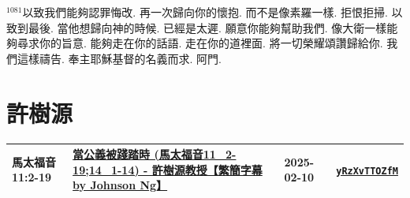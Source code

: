 \documentclass{book}
\begin{document}
$^{1081}$以致我們能夠認罪悔改.
再一次歸向你的懷抱.
而不是像素羅一樣.
拒恨拒掃.
以致到最後.
當他想歸向神的時候.
已經是太遲.
願意你能夠幫助我們.
像大衛一樣能夠尋求你的旨意.
能夠走在你的話語.
走在你的道裡面.
將一切榮耀頌讚歸給你.
我們這樣禱告.
奉主耶穌基督的名義而求.
阿門.
\newpage



\chapter{許樹源}\label{ch:preacher13}
\begin{multicols}{3}
\minitoc
\end{multicols}
{ \scriptsize


\begin{xltabular}{\textwidth}{|p{0.15\textwidth} p{0.6\textwidth}|p{0.07\textwidth} p{0.1\textwidth}|}
\hline
馬太福音 11:2-19 & \hyperref[sec:yRzXvTTOZfM]{當公義被踐踏時  (馬太福音11\_2-19;14\_1-14) - 許樹源教授【繁簡字幕 by Johnson Ng】} & 2025-02-10 & \href{https://youtube.com/watch?v=yRzXvTTOZfM}{\texttt{yRzXvTTOZfM}} \\
\hline
\end{xltabular}
}
\newpage
\end{document}
